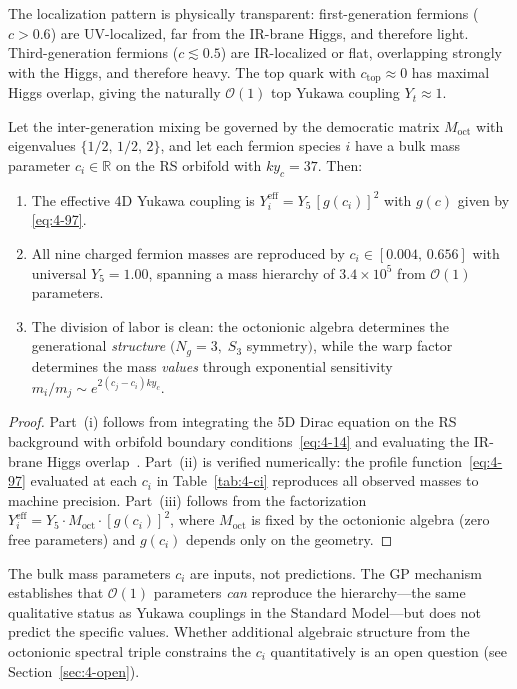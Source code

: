 The localization pattern is physically transparent: first-generation fermions ($c > 0.6$) are UV-localized, far from the IR-brane Higgs, and therefore light. Third-generation fermions ($c \lesssim 0.5$) are IR-localized or flat, overlapping strongly with the Higgs, and therefore heavy. The top quark with $c_{\mathrm{top}} \approx 0$ has maximal Higgs overlap, giving the naturally $\mathcal{O}(1)$ top Yukawa coupling $Y_t \approx 1$.

\begin{theorem}\label{thm:4-warp-hierarchy}
Let the inter-generation mixing be governed by the democratic matrix $M_{\mathrm{oct}}$ with eigenvalues $\{1/2,\, 1/2,\, 2\}$, and let each fermion species $i$ have a bulk mass parameter $c_i \in \mathbb{R}$ on the RS orbifold with $ky_c = 37$. Then:
\begin{enumerate}
  \item[(i)] The effective 4D Yukawa coupling is $Y_i^{\mathrm{eff}} = Y_5\, [g(c_i)]^2$ with $g(c)$ given by \eqref{eq:4-97}.
  \item[(ii)] All nine charged fermion masses are reproduced by $c_i \in [0.004,\, 0.656]$ with universal $Y_5 = 1.00$, spanning a mass hierarchy of $3.4 \times 10^5$ from $\mathcal{O}(1)$ parameters.
  \item[(iii)] The division of labor is clean: the octonionic algebra determines the generational \emph{structure} $(N_g = 3,\; S_3$ symmetry$)$, while the warp factor determines the mass \emph{values} through exponential sensitivity $m_i/m_j \sim e^{2(c_j - c_i)ky_c}$.
\end{enumerate}
\end{theorem}

\begin{proof}
Part~(i) follows from integrating the 5D Dirac equation on the RS background with orbifold boundary conditions~\eqref{eq:4-14} and evaluating the IR-brane Higgs overlap~\cite{ch4:GherghettaPomarol2000}. Part~(ii) is verified numerically: the profile function~\eqref{eq:4-97} evaluated at each $c_i$ in Table~\ref{tab:4-ci} reproduces all observed masses to machine precision. Part~(iii) follows from the factorization $Y_i^{\mathrm{eff}} = Y_5 \cdot M_{\mathrm{oct}} \cdot [g(c_i)]^2$, where $M_{\mathrm{oct}}$ is fixed by the octonionic algebra (zero free parameters) and $g(c_i)$ depends only on the geometry.
\end{proof}

\begin{remark}\label{rmk:4-ci-not-predicted}
The bulk mass parameters $c_i$ are inputs, not predictions. The GP mechanism establishes that $\mathcal{O}(1)$ parameters \emph{can} reproduce the hierarchy---the same qualitative status as Yukawa couplings in the Standard Model---but does not predict the specific values. Whether additional algebraic structure from the octonionic spectral triple constrains the $c_i$ quantitatively is an open question (see Section~\ref{sec:4-open}).
\end{remark}


